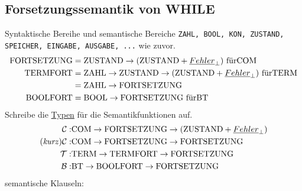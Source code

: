 \subsection{Forsetzungssemantik von WHILE}
Syntaktische Bereihe und semantische Bereiche \lstinline!ZAHL, BOOL, KON, ZUSTAND, SPEICHER, EINGABE, AUSGABE, ...! wie zuvor.\\
\begin{align*}
\text{\lstinline!FORTSETZUNG!} &= \text{\lstinline!ZUSTAND!} \rightarrow (\text{\lstinline!ZUSTAND!} + {\underline{Fehler}_\perp}) \text{ für} \text{\lstinline!COM!}\\
\text{\lstinline!TERMFORT!} &= \text{\lstinline!ZAHL!} \rightarrow \text{\lstinline!ZUSTAND!} \rightarrow (\text{\lstinline!ZUSTAND!} + {\underline{Fehler}_\perp}) \text{ für} \text{\lstinline!TERM!}\\
&= \text{\lstinline!ZAHL!} \rightarrow \text{\lstinline!FORTSETZUNG!}\\
\text{\lstinline!BOOLFORT!} &= \text{\lstinline!BOOL!} \rightarrow \text{\lstinline!FORTSETZUNG!} \text{ für} \text{\lstinline!BT!}\\
\end{align*}
Schreibe die \underline{Typen} für die Semantikfunktionen auf.
\begin{align*}
\mathcal{C}: & \text{\lstinline!COM!} \rightarrow \text{\lstinline!FORTSETZUNG!} \rightarrow (\text{\lstinline!ZUSTAND!} + {\underline{Fehler}_\perp}) \\
\text{(\emph{kurz})} \mathcal{C}: & \text{\lstinline!COM!} \rightarrow \text{\lstinline!FORTSETZUNG!} \rightarrow \text{\lstinline!FORTSETZUNG!} \\
\mathcal{T}: & \text{\lstinline!TERM!} \rightarrow \text{\lstinline!TERMFORT!} \rightarrow \text{\lstinline!FORTSETZUNG!}\\
\mathcal{B}: & \text{\lstinline!BT!} \rightarrow \text{\lstinline!BOOLFORT!} \rightarrow \text{\lstinline!FORTSETZUNG!}\\
\end{align*}
semantische Klauseln:

